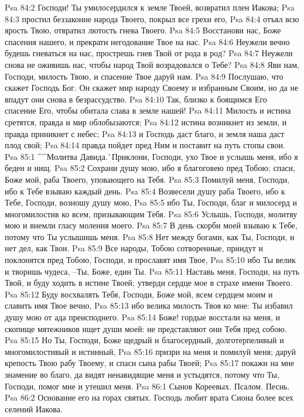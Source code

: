 Psa 84:2  Господи! Ты умилосердился к земле Твоей, возвратил плен Иакова;
Psa 84:3  простил беззаконие народа Твоего, покрыл все грехи его,
Psa 84:4  отъял всю ярость Твою, отвратил лютость гнева Твоего.
Psa 84:5  Восстанови нас, Боже спасения нашего, и прекрати негодование Твое на нас.
Psa 84:6  Неужели вечно будешь гневаться на нас, прострешь гнев Твой от рода в род?
Psa 84:7  Неужели снова не оживишь нас, чтобы народ Твой возрадовался о Тебе?
Psa 84:8  Яви нам, Господи, милость Твою, и спасение Твое даруй нам.
Psa 84:9  Послушаю, что скажет Господь Бог. Он скажет мир народу Своему и избранным Своим, но да не впадут они снова в безрассудство.
Psa 84:10  Так, близко к боящимся Его спасение Его, чтобы обитала слава в земле нашей!
Psa 84:11  Милость и истина сретятся, правда и мир облобызаются;
Psa 84:12  истина возникнет из земли, и правда приникнет с небес;
Psa 84:13  и Господь даст благо, и земля наша даст плод свой;
Psa 84:14  правда пойдет пред Ним и поставит на путь стопы свои.
Psa 85:1  ^^Молитва Давида.^^ Приклони, Господи, ухо Твое и услышь меня, ибо я беден и нищ.
Psa 85:2  Сохрани душу мою, ибо я благоговею пред Тобою; спаси, Боже мой, раба Твоего, уповающего на Тебя.
Psa 85:3  Помилуй меня, Господи, ибо к Тебе взываю каждый день.
Psa 85:4  Возвесели душу раба Твоего, ибо к Тебе, Господи, возношу душу мою,
Psa 85:5  ибо Ты, Господи, благ и милосерд и многомилостив ко всем, призывающим Тебя.
Psa 85:6  Услышь, Господи, молитву мою и внемли гласу моления моего.
Psa 85:7  В день скорби моей взываю к Тебе, потому что Ты услышишь меня.
Psa 85:8  Нет между богами, как Ты, Господи, и нет дел, как Твои.
Psa 85:9  Все народы, Тобою сотворенные, приидут и поклонятся пред Тобою, Господи, и прославят имя Твое,
Psa 85:10  ибо Ты велик и творишь чудеса, --Ты, Боже, един Ты.
Psa 85:11  Наставь меня, Господи, на путь Твой, и буду ходить в истине Твоей; утверди сердце мое в страхе имени Твоего.
Psa 85:12  Буду восхвалять Тебя, Господи, Боже мой, всем сердцем моим и славить имя Твое вечно,
Psa 85:13  ибо велика милость Твоя ко мне: Ты избавил душу мою от ада преисподнего.
Psa 85:14  Боже! гордые восстали на меня, и скопище мятежников ищет души моей: не представляют они Тебя пред собою.
Psa 85:15  Но Ты, Господи, Боже щедрый и благосердный, долготерпеливый и многомилостивый и истинный,
Psa 85:16  призри на меня и помилуй меня; даруй крепость Твою рабу Твоему, и спаси сына рабы Твоей;
Psa 85:17  покажи на мне знамение во благо, да видят ненавидящие меня и устыдятся, потому что Ты, Господи, помог мне и утешил меня.
Psa 86:1  Сынов Кореевых. Псалом. Песнь.
Psa 86:2  Основание его на горах святых. Господь любит врата Сиона более всех селений Иакова.
